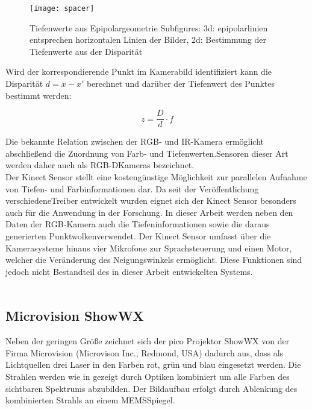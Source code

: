 \begin{figure}[ht]
	\begin{center}
		\texttt{[image: spacer]}
		\caption{Tiefenwerte aus Epipolargeometrie Subfigures: 3d: epipolarlinien entsprechen horizontalen Linien der Bilder, 2d: Bestimmung der Tiefenwerte aus der Disparität}
		\label{fig.kinect_depth}
	\end{center}
\end{figure}

Wird der korrespondierende Punkt im Kamerabild identifiziert kann die Disparität $d = x - x'$ berechnet und darüber der Tiefenwert des Punktes bestimmt werden:

\begin{equation}
z = \frac{D}{d}\cdot f
\end{equation}

Die bekannte Relation zwischen der RGB- und IR-Kamera ermöglicht abschließend die Zuordnung von Farb- und Tiefenwerten. Sensoren dieser Art werden daher auch als RGB-D\red[footnote] Kameras bezeichnet.\\

Der Kinect Sensor stellt eine kostengünstige Möglichkeit zur parallelen Aufnahme von Tiefen- und Farbinformationen dar. Da seit der Veröffentlichung verschiedene Treiber entwickelt wurden eignet sich der Kinect Sensor besonders auch für die Anwendung in der Forschung. In dieser Arbeit werden neben den Daten der RGB-Kamera auch die Tiefeninformationen sowie die daraus generierten Punktwolken\red[footnote?] verwendet. Der Kinect Sensor umfasst über die Kamerasysteme hinaus vier Mikrofone zur Sprachsteuerung und einen Motor, welcher die Veränderung des Neigungswinkels ermöglicht. Diese Funktionen sind jedoch nicht Bestandteil des in dieser Arbeit entwickelten Systems.\\


\\


\subsection{Microvision ShowWX}%
\label{chap.projector}
Neben der geringen Größe zeichnet sich der pico Projektor ShowWX von der Firma Microvision (Microvison Inc., Redmond, USA) dadurch aus, dass als Lichtquellen drei Laser in den Farben rot, grün und blau eingesetzt werden. Die Strahlen werden wie in  gezeigt durch Optiken kombiniert um alle Farben des sichtbaren Spektrums abzubilden. Der Bildaufbau erfolgt durch Ablenkung des kombinierten Strahls an einem MEMS\red[\footnote{MEMS = mikro-elektromechanisches System / Mikrospiegelaktor(?)}] Spiegel.

